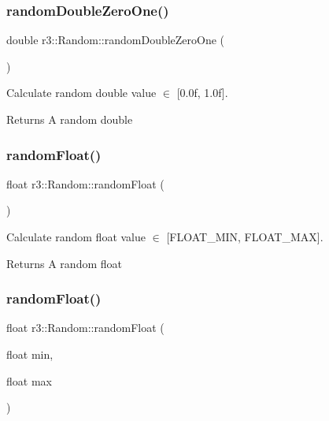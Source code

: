 \subsubsection{\texorpdfstring{random\+Double\+Zero\+One()}{randomDoubleZeroOne()}}
{\footnotesize\ttfamily double r3\+::\+Random\+::random\+Double\+Zero\+One (\begin{DoxyParamCaption}{ }\end{DoxyParamCaption})\hspace{0.3cm}{\ttfamily [static]}}



Calculate random double value $\in$ \mbox{[}0.\+0f, 1.\+0f\mbox{]}. 

\begin{DoxyReturn}{Returns}
A random double 
\end{DoxyReturn}
\mbox{\label{classr3_1_1_random_a3b1100f056013575372f2b1a362da39f}} 
\subsubsection{\texorpdfstring{random\+Float()}{randomFloat()}\hspace{0.1cm}{\footnotesize\ttfamily [1/2]}}
{\footnotesize\ttfamily float r3\+::\+Random\+::random\+Float (\begin{DoxyParamCaption}{ }\end{DoxyParamCaption})\hspace{0.3cm}{\ttfamily [static]}}



Calculate random float value $\in$ \mbox{[}F\+L\+O\+A\+T\+\_\+\+M\+IN, F\+L\+O\+A\+T\+\_\+\+M\+AX\mbox{]}. 

\begin{DoxyReturn}{Returns}
A random float 
\end{DoxyReturn}
\mbox{\label{classr3_1_1_random_a37e0fe288d26258964bb724c7335446c}} 
\subsubsection{\texorpdfstring{random\+Float()}{randomFloat()}\hspace{0.1cm}{\footnotesize\ttfamily [2/2]}}
{\footnotesize\ttfamily float r3\+::\+Random\+::random\+Float (\begin{DoxyParamCaption}\item[{float}]{min,  }\item[{float}]{max }\end{DoxyParamCaption})\hspace{0.3cm}{\ttfamily [static]}}



